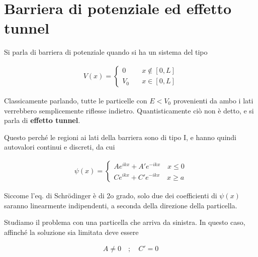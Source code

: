 \newpage

\section{Barriera di potenziale ed effetto tunnel}

Si parla di barriera di potenziale quando si ha un sistema del tipo

\begin{align}
V(x)= \left\{
\begin{array}{ccc}
0 \quad {}&x\notin[0,L]\\
V_0\quad &x\in[0,L]
\end{array} 
\right.
\end{align}

\begin{figure}[!htb]
\end{figure}

Classicamente parlando, tutte le particelle con $E<V_0$ provenienti da ambo i lati verrebbero semplicemente riflesse indietro. Quantisticamente ciò non è detto, e si parla di \textbf{effetto tunnel}.

Questo perché le regioni ai lati della barriera sono di tipo I, e hanno quindi autovalori continui e discreti, da cui

\begin{align}
\psi(x)=\left\{
\begin{array}{cc}
Ae^{ikx} + A'e^{-ikx} 	\quad x\leq 0\\
Ce^{ikx} + C'e^{-ikx} 	\quad x\geq a
\end{array}
\right.
\end{align}

Siccome l'eq. di Schrödinger è di 2o grado, solo due dei coefficienti di $\psi(x)$ saranno linearmente indipendenti, a seconda della direzione della particella.

Studiamo il problema con una particella che arriva da sinistra. In questo caso, affinché la soluzione sia limitata deve essere

\begin{align}
A\neq 0 \quad;\quad C'=0
\end{align}

